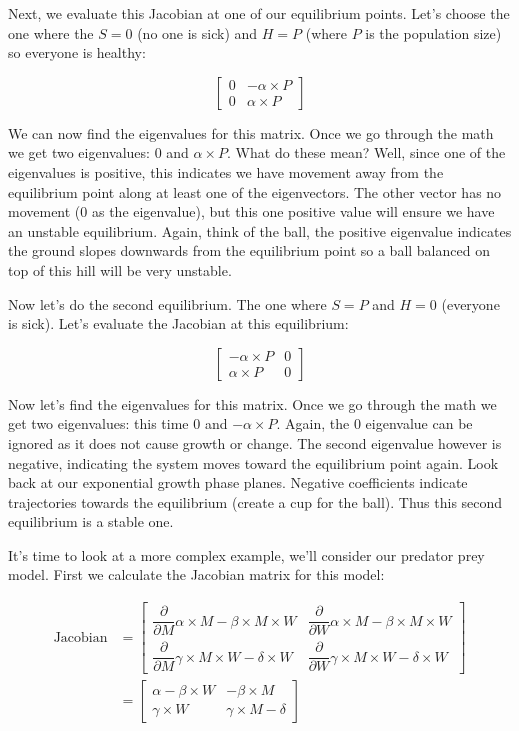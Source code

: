 \documentclass[]{memoir}
\begin{document}
Next, we evaluate this Jacobian at one of our equilibrium points. Let's
choose the one where the $S=0$ (no one is sick) and $H=P$ (where $P$ is
the population size) so everyone is healthy:

\[
\begin{bmatrix}
0 & -\alpha \times P \\
0 & \alpha \times P
\end{bmatrix}
\]

We can now find the eigenvalues for this matrix. Once we go through the
math we get two eigenvalues: 0 and $\alpha \times P$. What do these
mean? Well, since one of the eigenvalues is positive, this indicates we
have movement away from the equilibrium point along at least one of the
eigenvectors. The other vector has no movement (0 as the eigenvalue),
but this one positive value will ensure we have an unstable equilibrium.
Again, think of the ball, the positive eigenvalue indicates the ground
slopes downwards from the equilibrium point so a ball balanced on top of
this hill will be very unstable.

Now let's do the second equilibrium. The one where $S=P$ and $H=0$
(everyone is sick). Let's evaluate the Jacobian at this equilibrium:

\[
\begin{bmatrix}
-\alpha \times P & 0 \\
\alpha \times P & 0
\end{bmatrix}
\]

Now let's find the eigenvalues for this matrix. Once we go through the
math we get two eigenvalues: this time 0 and $-\alpha \times P$. Again,
the 0 eigenvalue can be ignored as it does not cause growth or change.
The second eigenvalue however is negative, indicating the system moves
toward the equilibrium point again. Look back at our exponential growth
phase planes. Negative coefficients indicate trajectories towards the
equilibrium (create a cup for the ball). Thus this second equilibrium is
a stable one.

It's time to look at a more complex example, we'll consider our predator
prey model. First we calculate the Jacobian matrix for this model:

\[
\begin{split}
\text{Jacobian} &= \begin{bmatrix} \dfrac{\partial}{\partial M }  \alpha \times M - \beta \times M \times W & \dfrac{\partial}{\partial W }  \alpha \times M - \beta \times M \times W  \\  \dfrac{\partial}{\partial M } \gamma \times M \times W - \delta \times W & \dfrac{\partial}{\partial W } \gamma \times M \times W - \delta \times W \end{bmatrix} \\
& = \begin{bmatrix}
\alpha - \beta \times W & -\beta \times M \\
\gamma \times W & \gamma \times M - \delta
\end{bmatrix}
\end{split}
\]
\end{document}
